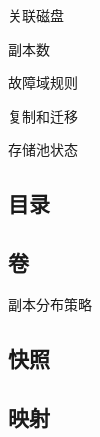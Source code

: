 关联磁盘

副本数

故障域规则

复制和迁移

存储池状态

\subsection{目录}

\subsection{卷}

副本分布策略

\subsection{快照}

\subsection{映射}


